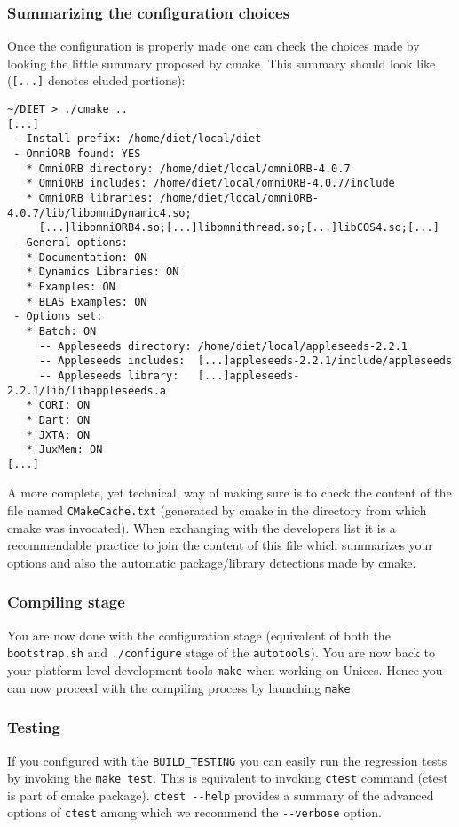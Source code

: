 \subsubsection{Summarizing the configuration choices}
Once the configuration is properly made one can check the choices made by
looking the little summary proposed by cmake.  This summary should look like
(\verb+[...]+ denotes eluded portions): {\footnotesize
\begin{verbatim}
~/DIET > ./cmake ..
[...]
 - Install prefix: /home/diet/local/diet
 - OmniORB found: YES
   * OmniORB directory: /home/diet/local/omniORB-4.0.7
   * OmniORB includes: /home/diet/local/omniORB-4.0.7/include
   * OmniORB libraries: /home/diet/local/omniORB-4.0.7/lib/libomniDynamic4.so;
     [...]libomniORB4.so;[...]libomnithread.so;[...]libCOS4.so;[...]
 - General options:
   * Documentation: ON
   * Dynamics Libraries: ON
   * Examples: ON
   * BLAS Examples: ON
 - Options set:
   * Batch: ON
     -- Appleseeds directory: /home/diet/local/appleseeds-2.2.1
     -- Appleseeds includes:  [...]appleseeds-2.2.1/include/appleseeds
     -- Appleseeds library:   [...]appleseeds-2.2.1/lib/libappleseeds.a
   * CORI: ON
   * Dart: ON
   * JXTA: ON
   * JuxMem: ON
[...]
\end{verbatim}
} A more complete, yet technical, way of making sure is to check the
content of the file named \verb+CMakeCache.txt+ (generated by cmake in
the directory from which cmake was invocated). When exchanging with
the developers list it is a recommendable practice to join the content
of this file which summarizes your options and also the automatic
package/library detections made by cmake.

\subsubsection{Compiling stage}
You are now done with the configuration stage (equivalent of both the
\verb+bootstrap.sh+ and \verb+./configure+ stage of the
\verb+autotools+). You are now back to your platform level
development tools \ie \verb+make+ when working on Unices. Hence you
can now proceed with the compiling process by launching \verb+make+.

\subsubsection{Testing}
If you configured \diet with the \verb+BUILD_TESTING+ you can easily run the
regression tests by invoking the \verb+make test+. This is equivalent to
invoking \verb+ctest+ command (ctest is part of cmake
package). \verb+ctest --help+ provides a summary of the advanced options of
\verb+ctest+ among which we recommend the \verb+--verbose+ option.

